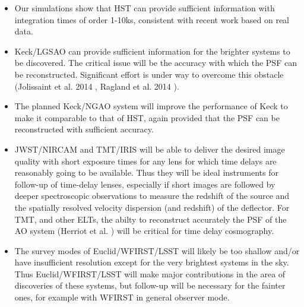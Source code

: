 \documentclass[a4paper,11pt]{article}
\begin{document}
\begin{itemize}

\item Our simulations show that HST can provide sufficient information
with integration times of order 1-10ks, consistent with recent work based
on real data.

\item Keck/LGSAO can provide sufficient information for the brighter
systems to be discovered. The critical issue will be the accuracy with
which the PSF can be reconstructed. Significant effort is under way to
overcome this obstacle (Jolissaint et al. 2014
\cite{2014SPIE.9148E..4SJ}, Ragland et al. 2014
\cite{2014SPIE.9148E..0SR}).

\item The planned Keck/NGAO system will improve the performance of
Keck to make it comparable to that of HST, again provided that the PSF can
be reconstructed with sufficient accuracy.

\item JWST/NIRCAM and TMT/IRIS will be able to deliver the desired
image quality with short exposure times for any lens for which time
delays are reasonably going to be available. Thus they will be ideal
instruments for follow-up of time-delay lenses, especially if short
images are followed by deeper spectroscopic observations to measure
the redshift of the source and the spatially resolved velocity
dispersion (and redshift) of the deflector. For TMT, and other ELTs,
the abilty to reconstruct accurately the PSF of the AO system (Herriot
et al. \cite{2014SPIE.9148E..10H}) will be critical for time delay
cosmography.

\item The survey modes of Euclid/WFIRST/LSST will likely be too
shallow and/or have insufficient resolution except for the very
brightest systems in the sky. Thus Euclid/WFIRST/LSST will make major
contributions in the area of discoveries of these systems, but follow-up
will be necessary for the fainter ones, for example with WFIRST in
general observer mode.

\end{itemize}
\end{document}
